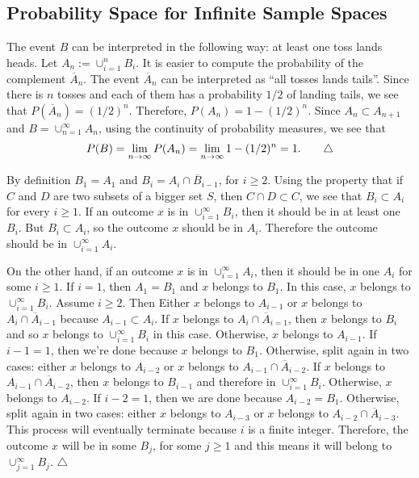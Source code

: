 	\subsection{Probability Space for Infinite Sample Spaces}
	
	\begin{problem}
	The event $B$ can be interpreted in the following way: at least one toss lands heads. Let $A_n := \cup_{i = 1}^n B_i$. It is easier to compute the probability of the complement $\overline{A}_n$. The event $\overline{A}_n$ can be interpreted as ``all tosses lands tails''. Since there is $n$ tosses and each of them has a probability $1/2$ of landing tails, we see that $P (\overline{A}_n) = (1/2)^n$. Therefore, $P (A_n) = 1 - (1/2)^n$. Since $A_n \subset A_{n + 1}$ and $B = \cup_{n = 1}^\infty A_n$, using the continuity of probability measures, we see that
		\begin{align*}
		P (B) = \lim_{n \rightarrow \infty} P (A_n) = \lim_{n \rightarrow \infty} 1 - (1/2)^n = 1 . \tag*{$\triangle$}
		\end{align*}
	\end{problem}

	\begin{problem}
	By definition $B_1 = A_1$ and $B_i = A_{i} \cap \overline{B}_{i - 1}$, for $i \geq 2$. Using the property that if $C$ and $D$ are two subsets of a bigger set $S$, then $C \cap D \subset C$, we see that $B_i \subset A_i$ for every $i \geq 1$. If an outcome $x$ is in $\cup_{i = 1}^\infty B_i$, then it should be in at least one $B_i$. But $B_i \subset A_i$, so the outcome $x$ should be in $A_i$. Therefore the outcome should be in $\cup_{i = 1}^\infty A_i$.
	
	On the other hand, if an outcome $x$ is in $\cup_{i = 1}^\infty A_i$, then it should be in one $A_i$ for some $i \geq 1$. If $i = 1$, then $A_1 = B_1$ and $x$ belongs to $B_1$. In this case, $x$ belongs to $\cup_{i = 1}^\infty B_i$. Assume $i \geq 2$. Then Either $x$ belongs to $A_{i-1}$ or $x$ belongs to $A_{i} \cap \overline{A}_{i-1}$ because $A_{i-1} \subset A_{i}$. If $x$ belongs to $A_{i} \cap \overline{A}_{i=1}$, then $x$ belongs to $B_{i}$ and so $x$ belongs to $\cup_{i = 1}^\infty B_i$ in this case. Otherwise, $x$ belongs to $A_{i-1}$. If $i -1 = 1$, then we're done because $x$ belongs to $B_1$. Otherwise, split again in two cases: either $x$ belongs to $A_{i - 2}$ or $x$ belongs to $A_{i - 1} \cap \overline{A}_{i -2}$. If $x$ belongs to $A_{i - 1} \cap \overline{A}_{i - 2}$, then $x$ belongs to $B_{i - 1}$ and therefore in $\cup_{i = 1}^\infty B_i$. Otherwise, $x$ belongs to $A_{i - 2}$. If $i - 2 = 1$, then we are done because $A_{i - 2} = B_1$. Otherwise, split again in two cases: either $x$ belongs to $A_{i - 3}$ or $x$ belongs to $A_{i - 2} \cap \overline{A}_{i - 3}$. This process will eventually terminate because $i$ is a finite integer. Therefore, the outcome $x$ will be in some $B_j$, for some $j \geq 1$ and this means it will belong to $\cup_{j = 1}^\infty B_j$. \hfill$\triangle$
	\end{problem}

